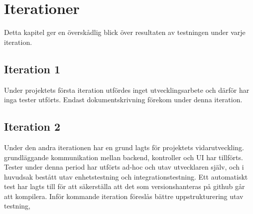 \documentclass[10pt]{article}
\begin{document}
\section{Iterationer}
Detta kapitel ger en överskådlig blick över resultaten av testningen under varje iteration.
\subsection{Iteration 1}
Under projektets första iteration utfördes inget utvecklingsarbete och därför har inga tester utförts. Endast dokumentskrivning förekom under denna iteration.
\subsection{Iteration 2}
Under den andra iterationen har en grund lagts för projektets vidarutveckling. grundläggande kommunikation mellan backend, kontroller och UI har tillförts. Tester under denna period har utförts ad-hoc och utav utvecklaren själv, och i huvudsak bestått utav enhetstestning och integrationstestning. Ett automatiskt test har lagts till för att säkerställa att det som versionshanteras på github går att kompilera. Inför kommande iteration föreslås bättre uppstrukturering utav testning,
\end{document}
